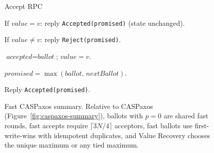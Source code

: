 \begin{figure}[t]
{\begin{minipage}[t]{\protcolwidth}
\begin{protbox}{Accept RPC}
\begin{protimpl}
\begin{protrules}
  \item If $\textit{value} = v$: reply \texttt{Accepted(promised)} (state unchanged).
  \item If $\textit{value} \neq v$: reply \texttt{Reject(promised)}.
  \end{protrules}
\item $\textit{accepted} = \textit{ballot}$;\; $\textit{value} = v$.
\item $\textit{promised} = \max(\textit{ballot},\, \textit{nextBallot})$.
\item Reply \texttt{Accepted(promised)}.
\end{protimpl}
\end{protbox}
\end{minipage}%
}%
\caption{Fast CASPaxos summary. Relative to CASPaxos (Figure~\ref{fig:caspaxos-summary}), ballots with $p = 0$ are shared fast rounds, fast accepts require $\lceil 3N/4 \rceil$ acceptors, fast ballots use first-write-wins with idempotent duplicates, and Value Recovery chooses the unique maximum or any tied maximum.}
\label{fig:fast-caspaxos-summary}
\end{figure}
